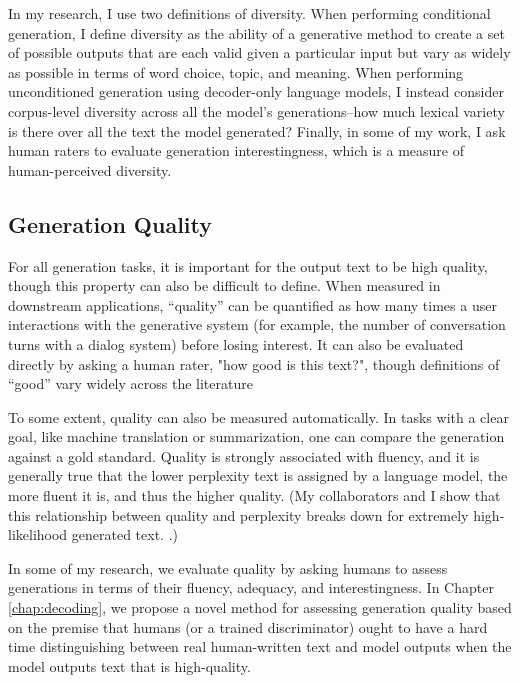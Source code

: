 \begin{itemize}
In my research, I use two definitions of diversity.
When performing conditional generation, I define diversity as the ability of a generative method to create a set of possible outputs that are each valid given a particular input but vary as widely as possible in terms of word choice, topic, and meaning.
When performing unconditioned generation using decoder-only language models, I instead consider corpus-level diversity across all the model's generations--how much lexical variety is there over all the text the model generated?
Finally, in some of my work, I ask human raters to evaluate generation interestingness, which is a measure of human-perceived diversity.


\subsection{Generation Quality}
For all generation tasks, it is important for the output text to be high quality, though this property can also be difficult to define.
When measured in downstream applications, ``quality'' can be quantified as how many times a user interactions with the generative system (for example, the number of conversation turns with a dialog system) before losing interest.
It can also be evaluated directly by asking a human rater, "how good is this text?", though definitions of ``good'' vary widely across the literature \citep{van2019best}

To some extent, quality can also be measured automatically.
In tasks with a clear goal, like machine translation or summarization, one can compare the generation against a gold standard.
Quality is strongly associated with fluency, and it is generally true that the lower perplexity text is assigned by a language model, the more fluent it is, and thus the higher quality.
(My collaborators and I show that this relationship between quality and perplexity breaks down for extremely high-likelihood generated text. \citep{zhang2021trading}.)

In some of my research, we evaluate quality by asking humans to assess generations in terms of their fluency, adequacy, and interestingness.
In Chapter \ref{chap:decoding}, we propose a novel method for assessing generation quality based on the premise that humans (or a trained discriminator) ought to have a hard time distinguishing between real human-written text and model outputs when the model outputs text that is high-quality.


\end{itemize}
